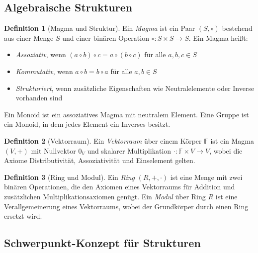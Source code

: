 \documentclass[a4paper,12pt]{article}
\theoremstyle{definition}
\newtheorem{definition}{Definition}
\begin{document}
\subsection{Algebraische Strukturen}

\begin{definition}[Magma und Struktur]
Ein \emph{Magma} ist ein Paar $(S, \circ)$ bestehend aus einer Menge $S$ und einer binären Operation $\circ: S \times S \to S$. Ein Magma heißt:
\begin{itemize}
\item \emph{Assoziativ}, wenn $(a \circ b) \circ c = a \circ (b \circ c)$ für alle $a, b, c \in S$
\item \emph{Kommutativ}, wenn $a \circ b = b \circ a$ für alle $a, b \in S$
\item \emph{Strukturiert}, wenn zusätzliche Eigenschaften wie Neutralelemente oder Inverse vorhanden sind
\end{itemize}
Ein Monoid ist ein assoziatives Magma mit neutralem Element. Eine Gruppe ist ein Monoid, in dem jedes Element ein Inverses besitzt.
\end{definition}

\begin{definition}[Vektorraum]
Ein \emph{Vektorraum} über einem Körper $\mathbb{F}$ ist ein Magma $(V, +)$ mit Nullvektor $0_V$ und skalarer Multiplikation $\cdot: \mathbb{F} \times V \to V$, wobei die Axiome Distributivität, Assoziativität und Einselement gelten.
\end{definition}

\begin{definition}[Ring und Modul]
Ein \emph{Ring} $(R, +, \cdot)$ ist eine Menge mit zwei binären Operationen, die den Axiomen eines Vektorraums für Addition und zusätzlichen Multiplikationsaxiomen genügt. Ein \emph{Modul} über Ring $R$ ist eine Verallgemeinerung eines Vektorraums, wobei der Grundkörper durch einen Ring ersetzt wird.
\end{definition}

\subsection{Schwerpunkt-Konzept für Strukturen}
\end{document}
